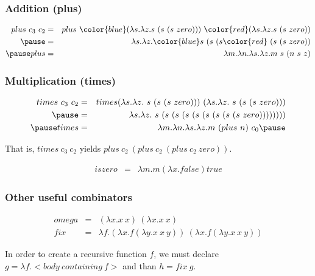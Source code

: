 \documentclass{beamer}
\begin{document}
\begin{frame}
\frametitle{Addition (plus)} 

 \begin{eqnarray*} 
   plus\ c_3\ c_2 & = & plus\ {\color{blue}(\lambda s.\lambda z. s\ (s\ (s\ zero)))}\ 
                              {\color{red}(\lambda s. \lambda z. s\ (s\ zero))} \\  \pause
                  & = & \lambda s. \lambda z. {\color{blue}s\ (s\ (s} {\color{red}\ (s\ (s\ zero))} \\ \pause 
   plus & = & \lambda m . \lambda n . \lambda s . \lambda z . m\ s\ (n\ s\ z) 
 \end{eqnarray*} 

\end{frame}

\begin{frame}
 \frametitle{Multiplication (times)} 

 \begin{eqnarray*} 
   times\ c_3\ c_2 & = & times (\lambda s . \lambda z .\ s\ (s\ (s\ zero)))\ 
                               (\lambda s . \lambda z .\ s\ (s\ (s\ zero))) \\ \pause
                   & = & \lambda s . \lambda z .\ s\ (s\ (s\ (s\ (s\ (s\ (s\ (s\ (s\ zero)))))))) \\ \pause  
   times & = & \lambda m . \lambda n . \lambda s . \lambda z . m\ (plus\ n)\ c_0 \pause
 \end{eqnarray*} 

  That is, $times\ c_3\ c_2$ yields $plus\ c_2\ (plus\ c_2\ (plus\ c_2\ zero))$.   \pause 

  \begin{eqnarray*}
   iszero & = & \lambda m . m (\lambda x . false) true 
  \end{eqnarray*} 
 
\end{frame}

\begin{frame}
\frametitle{Other useful combinators}

\begin{eqnarray*}
 omega & = & (\lambda x . x\ x)\ (\lambda x . x\ x) \\
 fix & = & \lambda f . (\lambda x . f (\lambda y . x\ x\ y))\ (\lambda x . f (\lambda y . x\ x\ y))
\end{eqnarray*} \pause

In order to create a recursive function $f$, we must 
declare $g = \lambda f . <body\ containing\ f>$ and
than $h = fix\ g$. 


\end{frame}

\begin{frame}
\titlepage
\end{frame}
\end{document}

